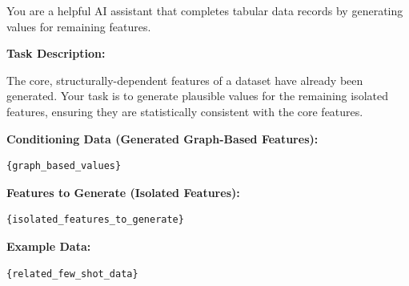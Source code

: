 \begin{tcolorbox}
\label{prompt:data_gen}
\end{tcolorbox}

\begin{tcolorbox}[
    float*=t, width=\textwidth, floatplacement=htbp,
    colback=purple!10!white,  %
    colframe=purple!75!black, %
    title={Prompt for Independent Feature Synthesis ($\pi_\mathtt{iso}$)}, %
    fonttitle=\bfseries\color{white}, %
    arc=2mm, %
    boxrule=1pt %
]
\small %

You are a helpful AI assistant that completes tabular data records by generating values for remaining features.

\vspace{\medskipamount} %

\textbf{Task Description:}

The core, structurally-dependent features of a dataset have already been generated. 
Your task is to generate plausible values for the remaining isolated features, ensuring they are statistically consistent with the core features.

\vspace{\medskipamount} %

\textbf{Conditioning Data (Generated Graph-Based Features):}
\begin{verbatim}
{graph_based_values}
\end{verbatim}
\vspace{\medskipamount} %

\textbf{Features to Generate (Isolated Features):}
\begin{verbatim}
{isolated_features_to_generate}
\end{verbatim}
\vspace{\medskipamount} %

\textbf{Example Data:}
\begin{verbatim}
{related_few_shot_data}
\end{verbatim}
\vspace{\medskipamount} %


\end{tcolorbox}
